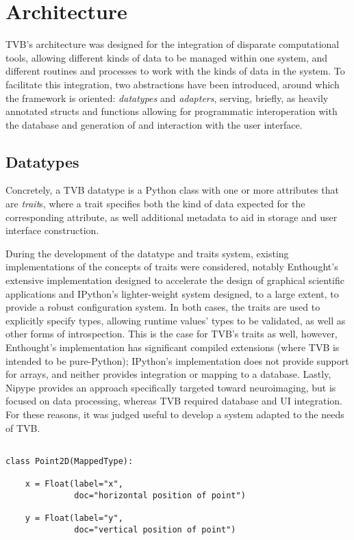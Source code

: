 \documentclass{bioinfo}
\begin{document}
\section{Architecture}

TVB's architecture was designed for the integration of disparate computational
tools, allowing different kinds of data to be managed within one system, and
different routines and processes to work with the kinds of data in the system.
To facilitate this integration, two abstractions have been introduced, around
which the framework is oriented: \textit{datatypes} and \textit{adapters},
serving, briefly, as heavily annotated structs and functions allowing for
programmatic interoperation with the database and generation of and interaction
with the user interface.

\subsection{Datatypes}

Concretely, a TVB datatype is a Python class with one or more attributes 
that are \textit{trait}s, where a trait specifies both the kind of data
expected for the corresponding attribute, as well additional metadata to
aid in storage and user interface construction. 

During the development of the datatype and traits system, existing implementations
of the concepts of traits were considered, notably Enthought's extensive 
implementation designed to accelerate the design of graphical scientific 
applications and IPython's lighter-weight system designed, to a large extent, 
to provide a robust configuration system. In both cases, the traits are used
to explicitly specify types, allowing runtime values' types to be validated, 
as well as other forms of introspection. This is the case for TVB's traits 
as well, however, Enthought's implementation has significant compiled extensions
(where TVB is intended to be pure-Python); IPython's implementation does not
provide support for arrays, and neither provides integration or mapping to a
database. Lastly, Nipype \citep{gorgolewski2011nipype} provides an approach
specifically targeted toward neuroimaging, but is focused on data processing, 
whereas TVB required database and UI integration.
For these reasons, it was judged useful to develop a system adapted 
to the needs of TVB. 

\begin{lstlisting}[caption={Example of a simple datatype modeling a point in two dimensions}, 
		   label={lst:traitexample}]

class Point2D(MappedType):

    x = Float(label="x",
              doc="horizontal position of point")

    y = Float(label="y",
              doc="vertical position of point")
	      
\end{lstlisting}
\end{document}
